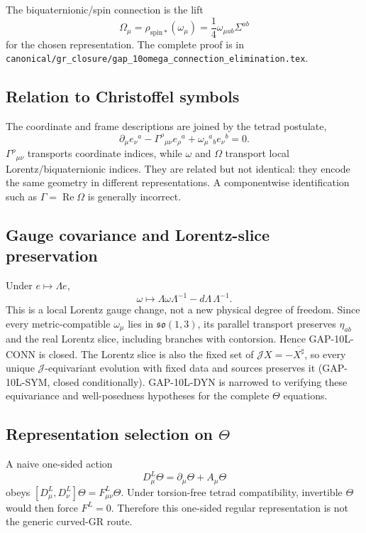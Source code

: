 The biquaternionic/spin connection is the lift
\begin{equation}
 \Omega_\mu=\rho_{\mathrm{spin}*}(\omega_\mu)
 =\frac14\omega_{\mu ab}\Sigma^{ab}
\end{equation}
for the chosen representation.  The complete proof is in
\texttt{canonical/gr\_closure/gap\_10omega\_connection\_elimination.tex}.

\subsection{Relation to Christoffel symbols}
The coordinate and frame descriptions are joined by the tetrad postulate,
\begin{equation}
 \partial_\mu e_\nu{}^a
 -\Gamma^\rho{}_{\mu\nu}e_\rho{}^a
 +\omega_\mu{}^a{}_b e_\nu{}^b=0.
 \label{eq:canonical:tetrad-postulate}
\end{equation}
$\Gamma^\rho{}_{\mu\nu}$ transports coordinate indices, while $\omega$ and
$\Omega$ transport local Lorentz/biquaternionic indices.  They are related but not identical:
they encode the same geometry in different representations.  A componentwise
identification such as $\Gamma=\operatorname{Re}\Omega$ is generally incorrect.

\subsection{Gauge covariance and Lorentz-slice preservation}
Under $e\mapsto\Lambda e$,
\begin{equation}
 \omega\mapsto\Lambda\omega\Lambda^{-1}-d\Lambda\,\Lambda^{-1}.
\end{equation}
This is a local Lorentz gauge change, not a new physical degree of freedom.
Since every metric-compatible $\omega_\mu$ lies in $\mathfrak{so}(1,3)$, its
parallel transport preserves $\eta_{ab}$ and the real Lorentz slice, including
branches with contorsion. Hence GAP-10L-CONN is closed. The Lorentz slice is
also the fixed set of $\mathcal JX=-\overline{X^\sharp}$, so every unique
$\mathcal J$-equivariant evolution with fixed data and sources preserves it
(GAP-10L-SYM, closed conditionally). GAP-10L-DYN is narrowed to verifying
these equivariance and well-posedness hypotheses for the complete $\Theta$
equations.

\subsection{Representation selection on $\Theta$}
A naive one-sided action
\begin{equation}
 D^L_\mu\Theta=\partial_\mu\Theta+A_\mu\Theta
\end{equation}
obeys $[D^L_\mu,D^L_\nu]\Theta=F^L_{\mu\nu}\Theta$.  Under torsion-free
tetrad compatibility, invertible $\Theta$ would then force $F^L=0$.  Therefore
this one-sided regular representation is not the generic curved-GR route.

